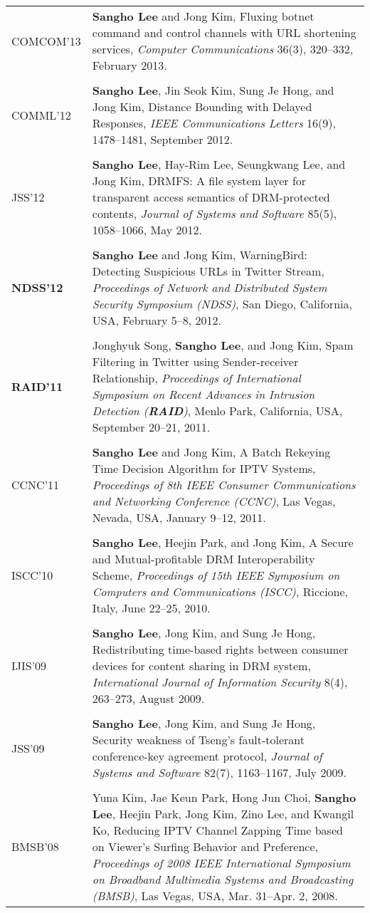 \documentclass[letterpaper]{article}
\begin{document}
\begin{longtable}{@{}p{0.8in}p{5.4in}@{}}
  COMCOM'13 & {\bf Sangho Lee} and Jong Kim, Fluxing botnet command and control channels with URL shortening services, {\it Computer Communications} 36(3), 320--332, February 2013.\\\\
  COMML'12 & {\bf Sangho Lee}, Jin Seok Kim, Sung Je Hong, and Jong Kim, Distance Bounding with Delayed Responses, {\it IEEE Communications Letters} 16(9), 1478--1481, September 2012.\\\\
  JSS'12 & {\bf Sangho Lee}, Hay-Rim Lee, Seungkwang Lee, and Jong Kim, DRMFS: A file system layer for transparent access semantics of DRM-protected contents, {\it Journal of Systems and Software} 85(5), 1058--1066, May 2012.\\\\
  \textbf{NDSS'12} & {\bf Sangho Lee} and Jong Kim, WarningBird: Detecting Suspicious URLs in Twitter Stream, \emph{Proceedings of Network and Distributed System Security Symposium ({NDSS})}, San Diego, California, USA, February 5--8, 2012.\\\\
  \textbf{RAID'11} & Jonghyuk Song, {\bf Sangho Lee}, and Jong Kim, Spam Filtering in Twitter using Sender-receiver Relationship, \emph{Proceedings of International Symposium on Recent Advances in Intrusion Detection (\textbf{RAID})}, Menlo Park, California, USA, September 20--21, 2011.\\\\
  CCNC'11 & {\bf Sangho Lee} and Jong Kim, A Batch Rekeying Time Decision Algorithm for IPTV Systems, {\it Proceedings of 8th IEEE Consumer Communications and Networking Conference (CCNC)}, Las Vegas, Nevada, USA, January 9--12, 2011.\\\\
  ISCC'10 & {\bf Sangho Lee}, Heejin Park, and Jong Kim, A Secure and Mutual-profitable DRM Interoperability Scheme, {\it Proceedings of 15th IEEE Symposium on Computers and Communications (ISCC)}, Riccione, Italy, June 22--25, 2010.\\\\
  IJIS'09 & {\bf Sangho Lee}, Jong Kim, and Sung Je Hong, Redistributing time-based rights between consumer devices for content sharing in DRM system, {\it International Journal of Information Security} 8(4), 263--273, August 2009.\\\\
  JSS'09 & {\bf Sangho Lee}, Jong Kim, and Sung Je Hong,  Security weakness of Tseng's fault-tolerant conference-key agreement protocol, {\it Journal of Systems and Software} 82(7), 1163--1167, July 2009.\\\\
  BMSB'08 & Yuna Kim, Jae Keun Park, Hong Jun Choi, {\bf Sangho Lee}, Heejin Park, Jong Kim, Zino Lee, and Kwangil Ko, Reducing IPTV Channel Zapping Time based on Viewer's Surfing Behavior and Preference, {\it Proceedings of 2008 IEEE International Symposium on Broadband Multimedia Systems and Broadcasting (BMSB)}, Las Vegas, USA, Mar. 31--Apr. 2, 2008.
\end{longtable}
\end{document}
